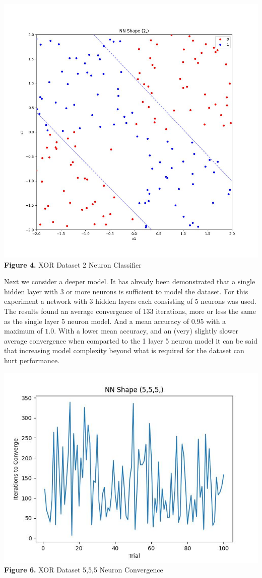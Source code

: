 \documentclass[11pt]{article}
\begin{document}
\includegraphics{figures/xor_2_clf.jpg}\\
\textbf{Figure 4.} XOR Dataset 2 Neuron Classifier

Next we consider a deeper model. It has already been demonstrated that a
single hidden layer with 3 or more neurons is sufficient to model the
dataset. For this experiment a network with 3 hidden layers each
consisting of 5 neurons was used. The results found an average
convergence of \(133\) iterations, more or less the same as the single
layer 5 neuron model. And a mean accuracy of \(0.95\) with a maximum of
\(1.0\). With a lower mean accuracy, and an (very) slightly slower
average convergence when comparted to the 1 layer 5 neuron model it can
be said that increasing model complexity beyond what is required for the
dataset can hurt performance.

\includegraphics{figures/xor_555_conv.jpg}\\
\textbf{Figure 6.} XOR Dataset 5,5,5 Neuron Convergence
\end{document}

